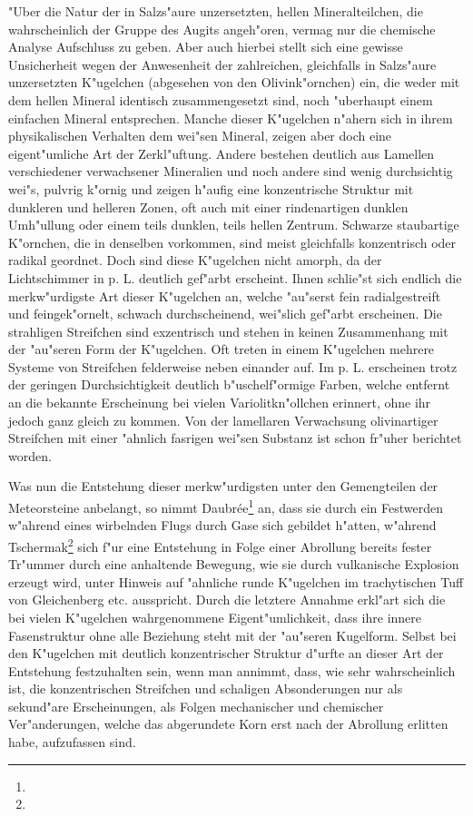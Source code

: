 \documentclass[a4paper, 11pt, oneside]{article}
\begin{document}
"Uber die Natur der in Salzs"aure unzersetzten, hellen Mineralteilchen, die wahrscheinlich der Gruppe des Augits angeh"oren, vermag nur die chemische Analyse Aufschluss zu geben. Aber auch hierbei stellt sich eine gewisse Unsicherheit wegen der Anwesenheit der zahlreichen, gleichfalls in Salzs"aure unzersetzten K"ugelchen (abgesehen von den Olivink"ornchen) ein, die weder mit dem hellen Mineral identisch zusammengesetzt sind, noch "uberhaupt einem einfachen Mineral entsprechen. Manche dieser K"ugelchen n"ahern sich in ihrem physikalischen Verhalten dem wei"sen Mineral, zeigen aber doch eine eigent"umliche Art der Zerkl"uftung. Andere bestehen deutlich aus Lamellen verschiedener verwachsener Mineralien und noch andere sind wenig durchsichtig wei"s, pulvrig k"ornig und zeigen h"aufig eine konzentrische Struktur mit dunkleren und helleren Zonen, oft auch mit einer rindenartigen dunklen Umh"ullung oder einem teils dunklen, teils hellen Zentrum. Schwarze staubartige K"ornchen, die in denselben vorkommen, sind meist gleichfalls konzentrisch oder radikal geordnet. Doch sind diese K"ugelchen nicht amorph, da der Lichtschimmer in p. L. deutlich gef"arbt erscheint. Ihnen schlie"st sich endlich die merkw"urdigste Art dieser K"ugelchen an, welche "au"serst fein radialgestreift und feingek"ornelt, schwach durchscheinend, wei"slich gef"arbt erscheinen. Die strahligen Streifchen sind exzentrisch und stehen in keinen Zusammenhang mit der "au"seren Form der K"ugelchen. Oft treten in einem K"ugelchen mehrere Systeme von Streifchen felderweise neben einander auf. Im p. L. erscheinen trotz der geringen Durchsichtigkeit deutlich b"uschelf"ormige Farben, welche entfernt an die bekannte Erscheinung bei vielen Variolitkn"ollchen erinnert, ohne ihr jedoch ganz gleich zu kommen. Von der lamellaren Verwachsung olivinartiger Streifchen mit einer "ahnlich fasrigen wei"sen Substanz ist schon fr"uher berichtet worden.

Was nun die Entstehung dieser merkw"urdigsten unter den Gemengteilen der Meteorsteine anbelangt, so nimmt Daubrée\footnote{} an, dass sie durch ein Festwerden w"ahrend eines wirbelnden Flugs durch Gase sich gebildet h"atten, w"ahrend Tschermak\footnote{} sich f"ur eine Entstehung in Folge einer Abrollung bereits fester Tr"ummer durch eine anhaltende Bewegung, wie sie durch vulkanische Explosion erzeugt wird, unter Hinweis auf "ahnliche runde K"ugelchen im trachytischen Tuff von Gleichenberg etc. ausspricht. Durch die letztere Annahme erkl"art sich die bei vielen K"ugelchen wahrgenommene Eigent"umlichkeit, dass ihre innere Fasenstruktur ohne alle Beziehung steht mit der "au"seren Kugelform. Selbst bei den K"ugelchen mit deutlich konzentrischer Struktur d"urfte an dieser Art der Entstehung festzuhalten sein, wenn man annimmt, dass, wie sehr wahrscheinlich ist, die konzentrischen Streifchen und schaligen Absonderungen nur als sekund"are Erscheinungen, als Folgen mechanischer und chemischer Ver"anderungen, welche das abgerundete Korn erst nach der Abrollung erlitten habe, aufzufassen sind.
\end{document}
